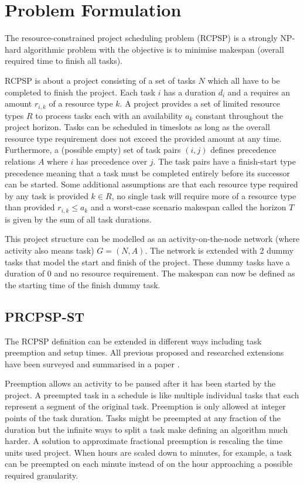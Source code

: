 \section{Problem Formulation}
The resource-constrained project scheduling problem (RCPSP) is a strongly NP-hard algorithmic problem \cite{RN20} with the objective is to minimise makespan (overall required time to finish all tasks). 

RCPSP is about a project consisting of a set of tasks \(N\) which all have to be completed to finish the project. Each task \(i\) has a duration \(d_i\) and a requires an amount \(r_{i,k}\) of a resource type \(k\). A project provides a set of limited resource types \(R\) to process tasks each with an availability \(a_k\) constant throughout the project horizon. Tasks can be scheduled in timeslots as long as the overall resource type requirement does not exceed the provided amount at any time. Furthermore, a (possible empty) set of task pairs \((i,j)\) defines precedence relations \(A\) where \(i\) has precedence over \(j\). The task pairs have a finish-start type precedence meaning that a task must be completed entirely before its successor can be started. Some additional assumptions are that each resource type required by any task is provided \(k\in R\), no single task will require more of a resource type than provided \(r_{i,k}\leq a_k\) and a worst-case scenario makespan called the horizon \(T\) is given by the sum of all task durations.

This project structure can be modelled as an activity-on-the-node network (where activity also means task) \(G=(N, A)\). The network is extended with 2 dummy tasks that model the start and finish of the project. These dummy tasks have a duration of 0 and no resource requirement. The makespan can now be defined as the starting time of the finish dummy task.

\subsection{PRCPSP-ST}
The RCPSP definition can be extended in different ways including task preemption and setup times. All previous proposed and researched extensions have been surveyed and summarised in a paper \cite{RN6, RN27}.

Preemption allows an activity to be paused after it has been started by the project. A preempted task in a schedule is like multiple individual tasks that each represent a segment of the original task. Preemption is only allowed at integer points of the task duration. Tasks might be preempted at any fraction of the duration but the infinite ways to split a task make defining an algorithm much harder. A solution to approximate fractional preemption is rescaling the time units used project. When hours are scaled down to minutes, for example, a task can be preempted on each minute instead of on the hour approaching a possible required granularity.

